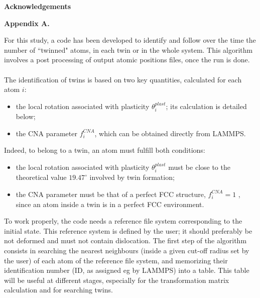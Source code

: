 \documentclass[final,3p,times,twocolumn]{elsarticle}
\begin{document}
\noindent\textbf{Acknowledgements}\newline
\label{part_acknowledgements}

\appendix
\noindent\textbf{Appendix A.}\newline
\label{part_appendix}

\renewcommand\thefigure{A.\arabic{figure}} 
\setcounter{figure}{0} 
\renewcommand\theequation{A.\arabic{equation}}
\setcounter{equation}{0}

For this study, a code has been developed to identify and follow over the time the number of ``twinned" atoms, in each twin or in the whole system. This algorithm involves a post processing of output atomic positions files, once the run is done. 
\\
\\
The identification of twins is based on two key quantities, calculated for each atom $i$:
\begin{itemize}
\item the local rotation associated with plasticity $\theta_{i}^{plast}$; its calculation is detailed below;
\item the CNA parameter $ f^{CNA}_{i} $, which can be obtained directly from LAMMPS.
\end{itemize}
Indeed, to belong to a twin, an atom must fulfill both conditions:
\begin{itemize}
\item the local rotation associated with plasticity $\theta_{i}^{plast}$ must be close to the theoretical value $19.47^{\circ}$ involved by twin formation;
\item the CNA parameter must be that of a perfect FCC structure, $f^{CNA}_{i} = 1$ , since an atom inside a twin is in a perfect FCC environment.
\end{itemize}

To work properly, the code needs a reference file system corresponding to the initial state. This reference system is defined by the user; it should preferably be not deformed and must not contain dislocation. The first step of the algorithm consists in searching the nearest neighbours (inside a given cut-off radius set by the user) of each atom of the reference file system, and memorizing their identification number (ID, as assigned eg by LAMMPS) into a table. This table will be useful at different stages, especially for the transformation matrix calculation and for searching twins.
 
\end{document}
